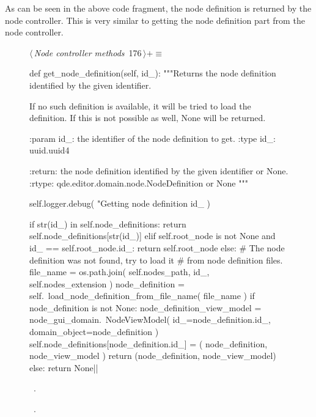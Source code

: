 \documentclass[%
    a4paper,    %
    justified,  %
    nobib,      %
    openany     %
]{tufte-book}
\makeatletter
\renewcommand{\label}[1]{\@tufte@label{##1}}%
\makeatother
\begin{document}
As can be seen in the above code fragment, the node definition is returned by
the node controller. This is very similar to getting the node definition part
from the node controller.

\begin{figure}[!htbp]
\begin{flushleft} \small
\begin{minipage}{\linewidth}\label{scrap147}\raggedright\small
{} $\langle\,${\itshape Node controller methods}\nobreak\ {\footnotesize {176}}$\,\rangle+\equiv$
\vspace{-1ex}
\begin{pythoncode}
def get_node_definition(self, id_):
    """Returns the node definition identified by the given
    identifier.

    If no such definition is available, it will be tried to load
    the definition. If this is not possible as well, None will
    be returned.

    :param id_: the identifier of the node definition to get.
    :type  id_: uuid.uuid4

    :return: the node definition identified by the given
             identifier or None.
    :rtype:  qde.editor.domain.node.NodeDefinition or None
    """

    self.logger.debug(
        "Getting node definition %
        id_
    )

    if str(id_) in self.node_definitions:
        return self.node_definitions[str(id_)]
    elif self.root_node is not None and id_ == self.root_node.id_:
        return self.root_node
    else:
        # The node definition was not found, try to load it
        # from node definition files.
        file_name = os.path.join(
            self.nodes_path,
            id_,
            self.nodes_extension
        )
        node_definition = self.\
            load_node_definition_from_file_name(
                    file_name
        )
        if node_definition is not None:
            node_definition_view_model = node_gui_domain.\
                NodeViewModel(
                        id_=node_definition.id_,
                        domain_object=node_definition
            )
            self.node_definitions[node_definition.id_] = (
                node_definition,
                node_view_model
            )
            return (node_definition, node_view_model)
        else:
            return None|\NWsep|
\end{pythoncode}
\vspace{1.5ex}
\footnotesize
\begin{list}{}{\setlength{\itemsep}{-\parsep}\setlength{\itemindent}{-\leftmargin}}
\item \NWtxtMacroDefBy\ .
\item \NWtxtMacroRefIn\ \NWlink{nuweb149a}{149a}.


\end{list}
\end{minipage}
\end{flushleft}
\end{figure}
\end{document}
